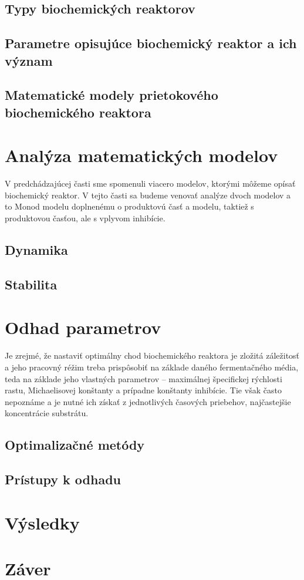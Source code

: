 \documentclass[fleqn]{article}
\begin{document}
\subsection{Typy biochemických reaktorov}


\subsection{Parametre opisujúce biochemický reaktor a ich význam}


\subsection{Matematické modely prietokového biochemického reaktora}


\section{Analýza matematických modelov}
V predchádzajúcej časti sme spomenuli viacero modelov, ktorými môžeme opísať biochemický reaktor. V tejto časti sa budeme venovať analýze dvoch modelov a to Monod modelu doplnenému o produktovú časť a modelu, taktiež s produktovou časťou, ale s vplyvom inhibície.

\subsection{Dynamika}


\subsection{Stabilita}


\section{Odhad parametrov}
Je zrejmé, že nastaviť optimálny chod biochemického reaktora je zložitá záležitosť a jeho pracovný réžim treba prispôsobiť na základe daného fermentačného média, teda na základe jeho vlastných parametrov -- maximálnej špecifickej rýchlosti rastu, Michaelisovej konštanty a prípadne konštanty inhibície. Tie však často nepoznáme a je nutné ich získať z jednotlivých časových priebehov, najčastejšie koncentrácie substrátu.

\subsection{Optimalizačné metódy}


\subsection{Prístupy k odhadu}


\section{Výsledky}


\section{Záver}


\newpage


\end{document}
